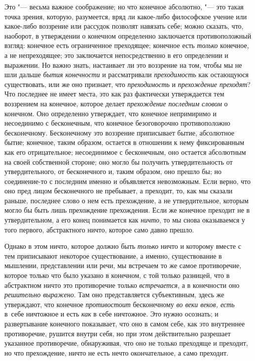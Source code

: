 Это "--- весьма важное соображение; но что конечное абсолютно, "--- это такая
точка зрения, которую, разумеется, вряд ли какое-либо философское учение
или какое-либо воззрение или рассудок позволят навязать себе; можно
сказать, что, наоборот, в утверждении о конечном определенно заключается
противоположный взгляд: конечное есть ограниченное преходящее; конечное
есть {\em только} конечное, а не непреходящее; это
заключается непосредственно в его определении и выражении. Но важно знать,
настаивает ли это воззрение на том, чтобы мы не шли дальше
{\em бытия конечности} и рассматривали
{\em преходимость} как остающуюся существовать, или же
оно признает, что {\em преходимость} и
{\em прехождение преходят}? Что последнее не имеет
места, это как раз фактически утверждается тем воззрением на конечное,
которое делает {\em прехождение последним словом} о
конечном. Оно определенно утверждает, что конечное непримиримо и
несоединимо с бесконечным, что конечное безоговорочно противоположно
бесконечному. Бесконечному это воззрение приписывает бытие, абсолютное
бытие; конечное, таким образом, остается в отношении к нему фиксированным
как его отрицательное; несоединимое с бесконечным, оно остается абсолютным
на своей собственной стороне; оно могло бы получить утвердительность от
утвердительного, от бесконечного и, таким образом, оно прешло бы; но
соединение-то с последним именно и объявляется невозможным. Если верно, что
оно пред лицом бесконечного не пребывает, а преходит, то, как мы сказали
раньше, последнее слово о нем есть прехождение, а не утвердительное,
которым могло бы быть лишь прехождение прехождения. Если же конечное
преходит не в утвердительном, а его конец понимается как
{\em ничто}, то мы снова оказываемся у того первого,
абстрактного ничто, которое само давно прешло.

Однако в этом ничто, которое должно быть {\em только}
ничто и которому вместе с тем приписывают некоторое существование, а
именно, существование в мышлении, представлении или речи, мы встречаем то
же самое противоречие, которое только что было указано в конечном, с той
только разницей, что в абстрактном ничто это противоречие только
{\em встречается}, а в конечности оно
{\em решительно выражено}. Там оно представляется
субъективным, здесь же утверждают, что конечное
{\em противостоит} бесконечному
{\em во веки веков, есть} в~себе ничтожное и есть {\em как} в себе ничтожное.
Это нужно осознать; и развертывание конечного показывает, что оно в самом себе,
как это внутреннее противоречие, рушится внутри себя, но при этом
действительно разрешает указанное противоречие, обнаруживая, что оно не
только преходяще и преходит, но что прехождение, ничто не есть нечто
окончательное, а само преходит.

